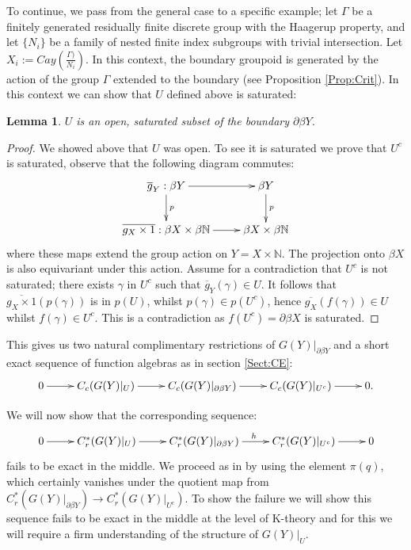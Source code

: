 \documentclass[11pt]{amsart}
\theoremstyle{plain}
\newtheorem{lemma}[theorem]{Lemma}%
\theoremstyle{definition}%
\theoremstyle{remark}%
\begin{document}
To continue, we pass from the general case to a specific example; let $\Gamma$ be a finitely generated residually finite discrete group with the Haagerup property, and let $\lbrace N_{i}\rbrace$ be a family of nested finite index subgroups with trivial intersection. Let $X_{i}:=Cay(\frac{\Gamma)}{N_{i}})$. In this context, the boundary groupoid is generated by the action of the group $\Gamma$ extended to the boundary (see Proposition \ref{Prop:Crit}). In this context we can show that $U$ defined above is saturated:

\begin{lemma}
$U$ is an open, saturated subset of the boundary $\partial\beta Y$. 
\end{lemma}
\begin{proof}
We showed above that $U$ was open. To see it is saturated we prove that $U^{c}$ is saturated, observe that the following diagram commutes:
\begin{equation*}
\xymatrix{
\overline{g}_{Y}:\beta Y\ar[r]\ar[d]^{p} & \beta Y\ar[d]^{p}\\
\overline{g_{X} \times 1}:  \beta X \times \beta \mathbb{N} \ar[r] & \beta X \times \beta \mathbb{N}
}
\end{equation*}
where these maps extend the group action on $Y=X \times \mathbb{N}$. The projection onto $\beta X$ is also equivariant under this action. Assume for a contradiction that $U^{c}$ is not saturated; there exists $\gamma$ in $U^{c}$ such that $\overline{g}_{Y}(\gamma) \in U$. It follows that $\overline{g_{X} \times 1}(p(\gamma))$ is in $p(U)$, whilst $p(\gamma) \in p(U^{c})$, hence $\overline{g_{X}}(f(\gamma))\in U$ whilst $f(\gamma) \in U^{c}$. This is a contradiction as $f(U^{c}) = \partial\beta X$ is saturated.
\end{proof}

This gives us two natural complimentary restrictions of $G(Y)|_{\partial\beta Y}$ and a short exact sequence of function algebras as in section \ref{Sect:CE}:
\begin{equation*}
\xymatrix{
0 \ar[r] & C_{c}(G(Y)|_{U}) \ar[r]& C_{c}(G(Y)|_{\partial\beta Y}) \ar[r] & C_{c}(G(Y)|_{U^{c}}) \ar[r] & 0.
}
\end{equation*}

We will now show that the corresponding sequence:
\begin{equation*}
\xymatrix{
0 \ar[r] & C^{*}_{r}(G(Y)|_{U}) \ar[r]& C_{r}^{*}(G(Y)|_{\partial\beta Y}) \ar[r]^{h} & C_{r}^{*}(G(Y)|_{U^{c}}) \ar[r] & 0
}
\end{equation*}
fails to be exact in the middle. We proceed as in \cite{explg1,MR1911663} by using the element $\pi(q)$, which certainly vanishes under the quotient map from $C^{*}_{r}(G(Y)|_{\partial\beta Y}) \rightarrow C^{*}_{r}(G(Y)|_{U^{c}})$. To show the failure we will show this sequence fails to be exact in the middle at the level of K-theory and for this we will require a firm understanding of the structure of $G(Y)|_{U}$.
\end{document}
